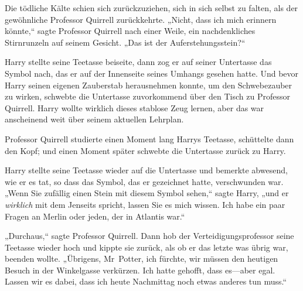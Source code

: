 Die tödliche Kälte schien sich zurückzuziehen, sich in sich selbst zu falten, als der gewöhnliche Professor Quirrell zurückkehrte. „Nicht, dass ich mich erinnern könnte,“ sagte Professor Quirrell nach einer Weile, ein nachdenkliches Stirnrunzeln auf seinem Gesicht. „Das ist der Auferstehungsstein?“

Harry stellte seine Teetasse beiseite, dann zog er auf seiner Untertasse das Symbol nach, das er auf der Innenseite seines Umhangs gesehen hatte. Und bevor Harry seinen eigenen Zauberstab herausnehmen konnte, um den Schwebezauber zu wirken, schwebte die Untertasse zuvorkommend über den Tisch zu Professor Quirrell. Harry wollte wirklich dieses stablose Zeug lernen, aber das war anscheinend weit über seinem aktuellen Lehrplan.

Professor Quirrell studierte einen Moment lang Harrys Teetasse, schüttelte dann den Kopf; und einen Moment später schwebte die Untertasse zurück zu Harry.

Harry stellte seine Teetasse wieder auf die Untertasse und bemerkte abwesend, wie er es tat, so dass das Symbol, das er gezeichnet hatte, verschwunden war. „Wenn Sie zufällig einen Stein mit diesem Symbol sehen,“ sagte Harry, „und er \emph{wirklich} mit dem Jenseits spricht, lassen Sie es mich wissen. Ich habe ein paar Fragen an Merlin oder jeden, der in Atlantis war.“

„Durchaus,“ sagte Professor Quirrell. Dann hob der Verteidigungsprofessor seine Teetasse wieder hoch und kippte sie zurück, als ob er das letzte was übrig war, beenden wollte. „Übrigens, Mr~Potter, ich fürchte, wir müssen den heutigen Besuch in der Winkelgasse verkürzen. Ich hatte gehofft, dass es—aber egal. Lassen wir es dabei, dass ich heute Nachmittag noch etwas anderes tun muss.“

